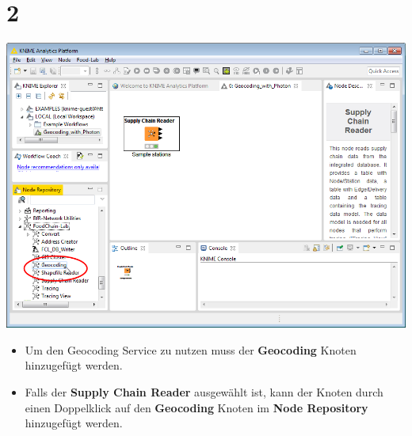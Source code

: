 \documentclass[10pt]{beamer}
\begin{document}
\section{2}
\begin{frame}
	\begin{center}
  		\includegraphics[height=0.6\textheight]{2.png}
	\end{center}
	\begin{itemize}
        \item Um den Geocoding Service zu nutzen muss der \textbf{Geocoding} Knoten hinzugefügt werden. 
        \item Falls der \textbf{Supply Chain Reader} ausgewählt ist, kann der Knoten durch einen Doppelklick auf den  \textbf{Geocoding} Knoten im \textbf{Node Repository} hinzugefügt werden. 
	\end{itemize}
\end{frame}
\end{document}
